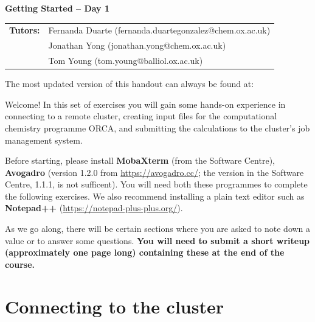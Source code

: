 \documentclass[10pt]{article}
\begin{document}
\textbf{\LARGE Getting Started -- Day 1}

\vspace{0.2cm}

\begin{tabular}{ll} %
    \textbf{Tutors:} & Fernanda Duarte (fernanda.duartegonzalez@chem.ox.ac.uk) \\
     & Jonathan Yong (jonathan.yong@chem.ox.ac.uk) \\
     & Tom Young (tom.young@balliol.ox.ac.uk)
\end{tabular}

\vspace{0.2cm}

\begin{tcolorbox}[colframe=Green!70!white, colback=Green!10!white]
    The most updated version of this handout can always be found at:
    \begin{center}
    \end{center}
\end{tcolorbox}

Welcome! In this set of exercises you will gain some hands-on experience in connecting to a remote cluster, creating input files for the computational chemistry programme ORCA, and submitting the calculations to the cluster's job management system. 

Before starting, please install \textbf{MobaXterm} (from the Software Centre), \textbf{Avogadro} (version 1.2.0 from \url{https://avogadro.cc/}; the version in the Software Centre, 1.1.1, is not sufficent). You will need both these programmes to complete the following exercises. We also recommend installing a plain text editor such as \textbf{Notepad++} (\url{https://notepad-plus-plus.org/}).

As we go along, there will be certain sections where you are asked to note down a value or to answer some questions. \textbf{You will need to submit a short writeup (approximately one page long) containing these at the end of the course.}

\section{Connecting to the cluster}
\end{document}
